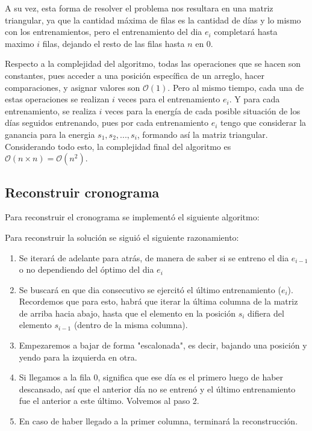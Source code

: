 A su vez, esta forma de resolver el problema nos resultara en una matriz triangular, ya que la cantidad máxima de filas es la cantidad de días y lo mismo con los entrenamientos, pero el entrenamiento del dia $e_i$ completará hasta maximo $i$ filas, dejando el resto de las filas hasta $n$ en 0.

Respecto a la complejidad del algoritmo, todas las operaciones que se hacen son constantes, pues acceder a una posición específica de un arreglo, hacer comparaciones, y asignar valores son $\mathcal{O}(1)$. Pero al mismo tiempo, cada una de estas operaciones se realizan $i$ veces para el entrenamiento $e_i$. Y para cada entrenamiento, se realiza $i$ veces para la energía de cada posible situación de los días seguidos entrenando, pues por cada entrenamiento $e_i$ tengo que considerar la ganancia para la energia $s_1, s_2, ..., s_i$, formando así la matriz triangular. Considerando todo esto, la complejidad final del algoritmo es $\mathcal{O}(n \times n) = \mathcal{O}(n^2)$.

\subsection{Reconstruir cronograma}

Para reconstruir el cronograma se implementó el siguiente algoritmo:



Para reconstruir la solución se siguió el siguiente razonamiento:

\begin{enumerate}
	\item Se iterará de adelante para atrás, de manera de saber si se entreno el dia $e_{i-1}$ o no dependiendo del óptimo del dia $e_i$
	\item Se buscará en que dia consecutivo se ejercitó el último entrenamiento ($e_i$). Recordemos que para esto, habrá que iterar la última columna de la matriz de arriba hacia abajo, hasta que el elemento en la posición $s_i$ difiera del elemento $s_{i-1}$ (dentro de la misma columna).
	\item Empezaremos a bajar de forma "escalonada", es decir, bajando una posición y yendo para la izquierda en otra.
	\item Si llegamos a la fila 0, significa que ese día es el primero luego de haber descansado, así que el anterior día no se entrenó y el último entrenamiento fue el anterior a este último. Volvemos al paso 2.
	\item En caso de haber llegado a la primer columna, terminará la reconstrucción.
\end{enumerate}



